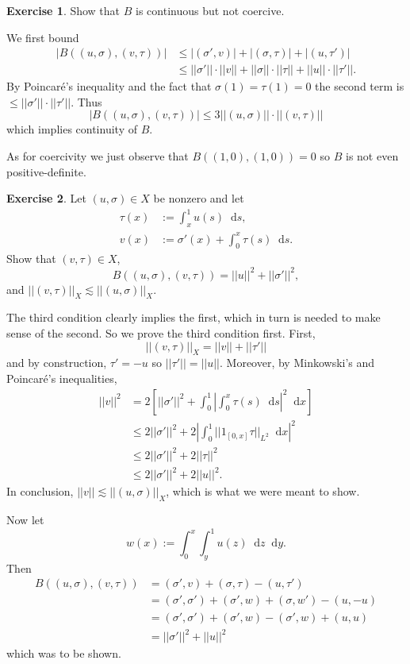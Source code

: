 \documentclass[10pt]{article}
\newcommand*\dif{\mathop{}\!\mathrm{d}}
\theoremstyle{definition}
\newtheorem{exer}{Exercise}
\begin{document}
\begin{exer}
    Show that $B$ is continuous but not coercive.
\end{exer}

We first bound 
\begin{align*}
    |B((u, \sigma), (v, \tau))| &\leq |(\sigma', v)| + |(\sigma, \tau)| + |(u, \tau')| \\
    &\leq ||\sigma'|| \cdot ||v|| + ||\sigma|| \cdot ||\tau|| + ||u|| \cdot ||\tau'||.
\end{align*}
By Poincar\'e's inequality and the fact that $\sigma(1) = \tau(1) = 0$ the second term is $\leq ||\sigma'|| \cdot ||\tau'||$.
Thus 
$$|B((u, \sigma), (v, \tau))| \leq 3 ||(u, \sigma)|| \cdot ||(v, \tau)||$$
which implies continuity of $B$.

As for coercivity we just observe that $B((1, 0), (1, 0)) = 0$ so $B$ is not even positive-definite.

\begin{exer}
    Let $(u, \sigma) \in X$ be nonzero and let 
\begin{align*}
    \tau(x) &:= \int_x^1 u(s) \dif s, \\
    v(x) &:= \sigma'(x) + \int_0^x \tau(s) \dif s.
\end{align*}
    Show that $(v, \tau) \in X$, 
    $$B((u, \sigma), (v, \tau)) = ||u||^2 + ||\sigma'||^2,$$
    and $||(v, \tau)||_X \lesssim ||(u, \sigma)||_X$.
\end{exer}

The third condition clearly implies the first, which in turn is needed to make sense of the second.
So we prove the third condition first.
First, 
$$||(v, \tau)||_X = ||v|| + ||\tau'||$$
and by construction, $\tau' = -u$ so $||\tau'|| = ||u||$.
Moreover, by Minkowski's and Poincar\'e's inequalities,
\begin{align*}
    ||v||^2
    &= 2\left[||\sigma'||^2 + \int_0^1 \left|\int_0^x \tau(s) \dif s\right|^2 \dif x\right] \\
    &\leq 2||\sigma'||^2 + 2 \left|\int_0^1 ||1_{[0, x]} \tau||_{L^2} \dif x\right|^2 \\
    &\leq 2||\sigma'||^2 + 2 ||\tau||^2 \\
    &\leq 2||\sigma'||^2 + 2 ||u||^2.
\end{align*}
In conclusion, $||v|| \lesssim ||(u, \sigma)||_X$, which is what we were meant to show.

Now let
$$w(x) := \int_0^x \int_y^1 u(z) \dif z \dif y.$$
Then
\begin{align*}
    B((u, \sigma), (v, \tau)) 
    &= (\sigma', v) + (\sigma, \tau) - (u, \tau') \\
    &= (\sigma', \sigma') + (\sigma', w) + (\sigma, w') - (u, -u) \\
    &= (\sigma', \sigma') + (\sigma', w) - (\sigma', w) + (u, u) \\
    &= ||\sigma'||^2 + ||u||^2
\end{align*}
which was to be shown.
\end{document}
